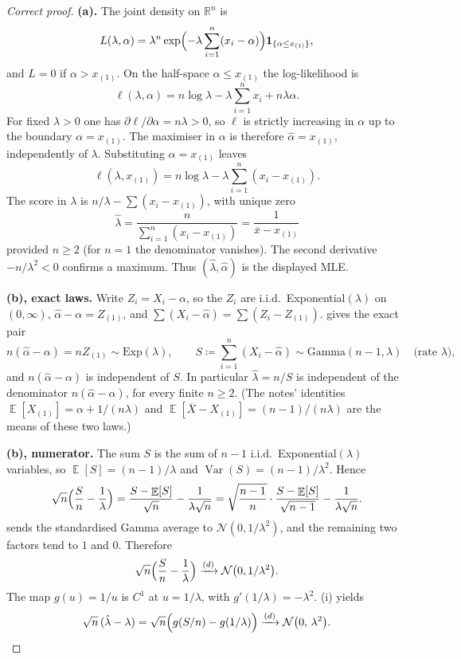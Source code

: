 \documentclass[11pt,a4paper]{article}
\DeclareMathOperator{\Var}{Var}
\DeclareMathOperator{\E}{\mathbb{E}}
\begin{document}
\begin{proof}[Correct proof]
\textbf{(a).}
The joint density on \( \mathbb{R}^{n} \) is
\[
L(\lambda,\alpha)
=
\lambda^{n}
\exp\Bigl(-\lambda\sum_{i=1}^{n}(x_i-\alpha)\Bigr)
\mathbf{1}_{\{\alpha\le x_{(1)}\}},
\]
and \( L=0 \) if \( \alpha>x_{(1)} \). On the half-space \( \alpha\le x_{(1)} \) the log-likelihood is
\[
\ell(\lambda,\alpha)
=
n\log\lambda
-
\lambda\sum_{i=1}^{n}x_i
+
n\lambda\alpha.
\]
For fixed \( \lambda>0 \) one has \( \partial\ell/\partial\alpha=n\lambda>0 \), so \( \ell \) is strictly increasing in \( \alpha \) up to the boundary \( \alpha=x_{(1)} \). The maximiser in \( \alpha \) is therefore \( \hat{\alpha}=x_{(1)} \), independently of \( \lambda \). Substituting \( \alpha=x_{(1)} \) leaves
\[
\ell(\lambda,x_{(1)})
=
n\log\lambda
-
\lambda\sum_{i=1}^{n}(x_i-x_{(1)}).
\]
The score in \( \lambda \) is \( n/\lambda-\sum(x_i-x_{(1)}) \), with unique zero
\[
\hat{\lambda}
=
\frac{n}{\sum_{i=1}^{n}(x_i-x_{(1)})}
=
\frac{1}{\overline{x}-x_{(1)}}
\]
provided \( n\ge 2 \) (for \( n=1 \) the denominator vanishes). The second derivative \( -n/\lambda^{2}<0 \) confirms a maximum. Thus \( (\hat{\lambda},\hat{\alpha}) \) is the displayed MLE.

\textbf{(b), exact laws.}
Write \( Z_i=X_i-\alpha \), so the \( Z_i \) are i.i.d.\ Exponential\( (\lambda) \) on \( (0,\infty) \), \( \hat{\alpha}-\alpha=Z_{(1)} \), and \( \sum(X_i-\hat{\alpha})=\sum(Z_i-Z_{(1)}) \).  gives the exact pair
\[
n(\hat{\alpha}-\alpha)
=
n Z_{(1)}
\sim
\mathrm{Exp}(\lambda),
\qquad
S
\coloneqq
\sum_{i=1}^{n}(X_i-\hat{\alpha})
\sim
\mathrm{Gamma}(n-1,\lambda)
\quad\text{(rate \(\lambda\))},
\]
and \( n(\hat{\alpha}-\alpha) \) is independent of \( S \). In particular \( \hat{\lambda}=n/S \) is independent of the denominator \( n(\hat{\alpha}-\alpha) \), for every finite \( n\ge 2 \). (The notes' identities \( \E[X_{(1)}]=\alpha+1/(n\lambda) \) and \( \E[\overline{X}-X_{(1)}]=(n-1)/(n\lambda) \) are the means of these two laws.)

\textbf{(b), numerator.}
The sum \( S \) is the sum of \( n-1 \) i.i.d.\ Exponential\( (\lambda) \) variables, so \( \E[S]=(n-1)/\lambda \) and \( \Var(S)=(n-1)/\lambda^{2} \). Hence
\[
\sqrt{n}\Bigl(\frac{S}{n}-\frac{1}{\lambda}\Bigr)
=
\frac{S-\E[S]}{\sqrt{n}}
-
\frac{1}{\lambda\sqrt{n}}
=
\sqrt{\frac{n-1}{n}}\cdot\frac{S-\E[S]}{\sqrt{n-1}}
-
\frac{1}{\lambda\sqrt{n}}.
\]
 sends the standardised Gamma average to \( \mathcal{N}(0,1/\lambda^{2}) \), and the remaining two factors tend to \( 1 \) and \( 0 \). Therefore
\[
\sqrt{n}\Bigl(\frac{S}{n}-\frac{1}{\lambda}\Bigr)
\xrightarrow{(d)}
\mathcal{N}\bigl(0,1/\lambda^{2}\bigr).
\]
The map \( g(u)=1/u \) is \( C^{1} \) at \( u=1/\lambda \), with \( g'(1/\lambda)=-\lambda^{2} \). (i) yields
\[
\sqrt{n}\,(\hat{\lambda}-\lambda)
=
\sqrt{n}\Bigl(g(S/n)-g(1/\lambda)\Bigr)
\xrightarrow{(d)}
\mathcal{N}\bigl(0,\,\lambda^{2}\bigr).
\]


\end{proof}
\end{document}
